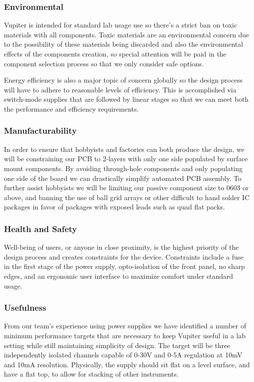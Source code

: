\documentclass[12pt]{article}
\begin{document}
\subsubsection{Environmental}
Vupiter is intended for standard lab usage use so there’s a strict ban on toxic materials 
with all components. Toxic materials are an environmental concern due to the possibility of these 
materials being discarded and also the environmental effects of the components creation, 
so special attention will be paid in the component selection process so that we only consider safe options.

Energy efficiency is also a major topic of concern globally so the design process will have to adhere to
reasonable levels of efficiency. This is accomplished via switch-mode supplies that are followed by linear stages so that we can meet both the performance and efficiency requirements.

\subsubsection{Manufacturability}
In order to ensure that hobbyists and factories can both produce the design, we will be constraining our PCB to
2-layers with only one side populated by surface mount components. By avoiding through-hole components and 
only populating one side of the board we can drastically simplify automated PCB assembly. To further assist hobbyists 
we will be limiting our passive component size to 0603 or above, and banning the use of ball grid arrays or other 
difficult to hand solder IC packages in favor of packages with exposed leads such as quad flat packs.
\subsubsection{Health and Safety}
Well-being of users, or anyone in close proximity, is the highest priority of the design process 
and creates constraints for the device. Constraints include a fuse in the first stage of the power supply, opto-isolation of the front panel, no sharp edges, and an ergonomic user interface to maximize comfort under standard usage.

\subsubsection{Usefulness}
From our team’s experience using power supplies we have identified a number of minimum 
performance targets that are necessary to keep Vupiter useful in a lab setting while still 
maintaining simplicity of design. The target will be three independently isolated channels 
capable of 0-30V and 0-5A regulation at 10mV and 10mA resolution. Physically, the supply 
should sit flat on a level surface, and have a flat top, to allow for stacking of other 
instruments.
\end{document}
